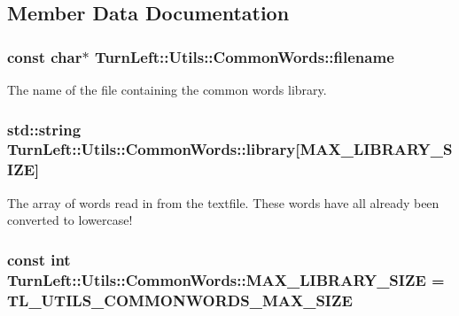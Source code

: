 \subsection{Member Data Documentation}
\hypertarget{classTurnLeft_1_1Utils_1_1CommonWords_aad1fbed4daae28a7e3023f2dcca967bc}{
\subsubsection[{filename}]{\setlength{\rightskip}{0pt plus 5cm}const char$\ast$ {\bf TurnLeft::Utils::CommonWords::filename}}}
\label{classTurnLeft_1_1Utils_1_1CommonWords_aad1fbed4daae28a7e3023f2dcca967bc}
The name of the file containing the common words library. \hypertarget{classTurnLeft_1_1Utils_1_1CommonWords_a682e0ab0f53b53cca62ff898c0fb58de}{
\subsubsection[{library}]{\setlength{\rightskip}{0pt plus 5cm}std::string {\bf TurnLeft::Utils::CommonWords::library}\mbox{[}{\bf MAX\_\-LIBRARY\_\-SIZE}\mbox{]}}}
\label{classTurnLeft_1_1Utils_1_1CommonWords_a682e0ab0f53b53cca62ff898c0fb58de}
The array of words read in from the textfile. These words have all already been converted to lowercase! \hypertarget{classTurnLeft_1_1Utils_1_1CommonWords_afc0cb129b7578c3ea5bf63cf3284e630}{
\subsubsection[{MAX\_\-LIBRARY\_\-SIZE}]{\setlength{\rightskip}{0pt plus 5cm}const int {\bf TurnLeft::Utils::CommonWords::MAX\_\-LIBRARY\_\-SIZE} = TL\_\-UTILS\_\-COMMONWORDS\_\-MAX\_\-SIZE}}
